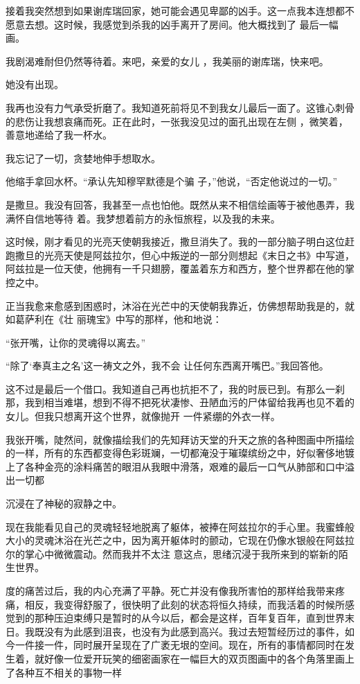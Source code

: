 \documentclass{article}
\begin{document}
接着我突然想到如果谢库瑞回家，她可能会遇见卑鄙的凶手。这一点我本连想都不愿意去想。这时候，我感觉到杀我的凶手离开了房间。他大概找到了
最后一幅画。 

我剧渴难耐但仍然等待着。来吧，亲爱的女儿
，我美丽的谢库瑞，快来吧。 

\newpage


她没有出现。 

我再也没有力气承受折磨了。我知道死前将见不到我女儿最后一面了。这锥心刺骨的悲伤让我想哀痛而死。正在此时，一张我没见过的面孔出现在左侧
，微笑着，善意地递给了我一杯水。 


我忘记了一切，贪婪地伸手想取水。 

他缩手拿回水杯。“承认先知穆罕默德是个骗
子，”他说，“否定他说过的一切。” 

是撒旦。我没有回答，我甚至一点也怕他。既然从来不相信绘画等于被他愚弄，我满怀自信地等待
着。我梦想着前方的永恒旅程，以及我的未来。 

这时候，刚才看见的光亮天使朝我接近，撒旦消失了。我的一部分脑子明白这位赶跑撒旦的光亮天使是阿兹拉尔，但心中叛逆的一部分则想起《末日之书》中写道，阿兹拉是一位天使，他拥有一千只翅膀，覆盖着东方和西方，整个世界都在他的掌控之中。
\newpage


正当我愈来愈感到困惑时，沐浴在光芒中的天使朝我靠近，仿佛想帮助我是的，就如葛萨利在《壮
丽瑰宝》中写的那样，他和地说： 


“张开嘴，让你的灵魂得以离去。” 

“除了‘奉真主之名’这一祷文之外，我不会
让任何东西离开嘴巴。”我回答他。 

这不过是最后一个借口。我知道自己再也抗拒不了，我的时辰已到。有那么一刹那，我到相当难堪，想到不得不把死状凄惨、丑陋血污的尸体留给我再也见不着的女儿。但我只想离开这个世界，就像抛开
一件紧绷的外衣一样。 

我张开嘴，陡然间，就像描绘我们的先知拜访天堂的升天之旅的各种图画中所描绘的一样，所有的东西都变得色彩斑斓，一切都淹没于璀璨缤纷之中，好似奢侈地镀上了各种金亮的涂料痛苦的眼泪从我眼中滑落，艰难的最后一口气从肺部和口中溢出一切都
\newpage

沉浸在了神秘的寂静之中。 

现在我能看见自己的灵魂轻轻地脱离了躯体，被捧在阿兹拉尔的手心里。我蜜蜂般大小的灵魂沐浴在光芒之中，因为离开躯体时的颤动，它现在仍像水银般在阿兹拉尔的掌心中微微震动。然而我并不太注
意这点，思绪沉浸于我所来到的崭新的陌生世界。 

度的痛苦过后，我的内心充满了平静。死亡并没有像我所害怕的那样给我带来疼痛，相反，我变得舒服了，很快明了此刻的状态将恒久持续，而我活着的时候所感觉到的那种压迫束缚只是暂时的从今以后，都会是这样，百年复百年，直到世界末日。我既没有为此感到沮丧，也没有为此感到高兴。我过去短暂经历过的事件，如今一件接一件，同时展开呈现在了广袤无垠的空间。现在，所有的事情都同时在发生着，就好像一位爱开玩笑的细密画家在一幅巨大的双页图画中的各个角落里画上了各种互不相关的事物一样
\end{document}
